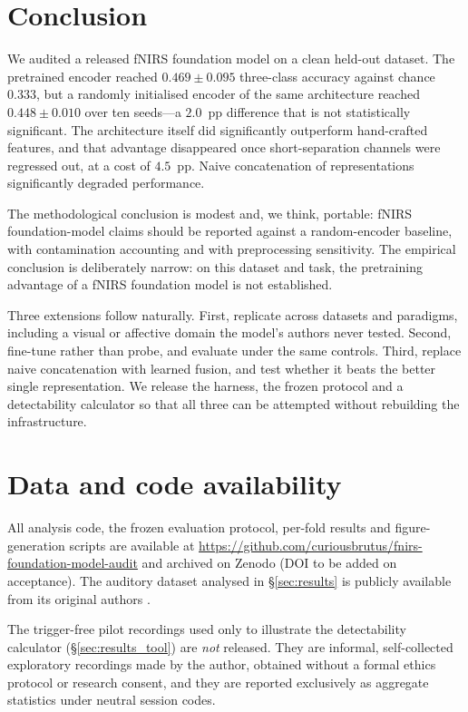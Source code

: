 \section{Conclusion}
\label{sec:conclusion}

We audited a released fNIRS foundation model on a clean held-out dataset. The pretrained
encoder reached $0.469 \pm 0.095$ three-class accuracy against chance $0.333$, but a randomly
initialised encoder of the same architecture reached $0.448 \pm 0.010$ over ten seeds---a
$2.0$~pp difference that is not statistically significant. The architecture itself did
significantly outperform hand-crafted features, and that advantage disappeared once
short-separation channels were regressed out, at a cost of $4.5$~pp. Naive concatenation of
representations significantly degraded performance.

The methodological conclusion is modest and, we think, portable: fNIRS foundation-model claims
should be reported against a random-encoder baseline, with contamination accounting and with
preprocessing sensitivity. The empirical conclusion is deliberately narrow: on this dataset and
task, the pretraining advantage of a fNIRS foundation model is not established.

Three extensions follow naturally. First, replicate across datasets and paradigms, including a
visual or affective domain the model's authors never tested. Second, fine-tune rather than
probe, and evaluate under the same controls. Third, replace naive concatenation with learned
fusion, and test whether it beats the better single representation. We release the harness, the
frozen protocol and a detectability calculator so that all three can be attempted without
rebuilding the infrastructure.

\section*{Data and code availability}
\label{sec:availability}
All analysis code, the frozen evaluation protocol, per-fold results and figure-generation scripts
are available at \url{https://github.com/curiousbrutus/fnirs-foundation-model-audit} and archived
on Zenodo (DOI to be added on acceptance). The auditory dataset analysed in
\S\ref{sec:results} is publicly available from its original authors \citep{luke2021passive}.

The trigger-free pilot recordings used only to illustrate the detectability calculator
(\S\ref{sec:results_tool}) are \emph{not} released. They are informal, self-collected exploratory
recordings made by the author, obtained without a formal ethics protocol or research consent, and
they are reported exclusively as aggregate statistics under neutral session codes.

